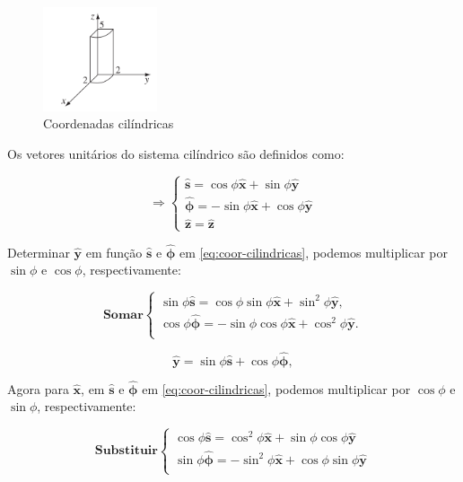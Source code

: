 \documentclass[a4paper,12pt]{article}
\begin{document}
\begin{figure}[htbp]
    \centering
    \includegraphics[width=0.3\textwidth]{images/cilindro.png}
    \caption{Coordenadas cilíndricas}
    \label{fig:exemplo}
\end{figure}


Os vetores unitários do sistema cilíndrico são definidos como:

\begin{equation}\label{eq:coor-cilindricas}
\Rightarrow
\begin{cases}
\hat{\mathbf{s}} = \cos\phi \hat{\mathbf{x}} + \sin\phi \hat{\mathbf{y}} \\
\hat{\bm{\phi}} = -\sin\phi \hat{\mathbf{x}} + \cos\phi \hat{\mathbf{y}} \\
\hat{\bm{z}} = \hat{\bm{z}}
\end{cases}
\end{equation}

Determinar $\hat{\mathbf{y}}$ em função $\hat{\mathbf{s}}$ e $\hat{\bm{\phi}}$ em \ref{eq:coor-cilindricas}, podemos multiplicar
por $\sin\phi$ e $\cos\phi$, respectivamente:

\begin{equation}
\mathbf{Somar}
\begin{cases}
    \sin\phi\hat{\mathbf{s}} = \cos\phi\sin\phi \hat{\mathbf{x}} + \sin^{2}\phi \hat{\mathbf{y}}, \\
    \cos\phi\hat{\bm{\phi}} = -\sin\phi\cos\phi \hat{\mathbf{x}} + \cos^{2}\phi \hat{\mathbf{y}}. \\
\end{cases}
\end{equation}

\begin{equation}
    \hat{\mathbf{y}} = \sin\phi \hat{\mathbf{s}} + \cos\phi \hat{\bm{\phi}},
\end{equation}

Agora para $\hat{\mathbf{x}}$, em $\hat{\mathbf{s}}$ e $\hat{\bm{\phi}}$ em \ref{eq:coor-cilindricas}, podemos multiplicar
por $\cos\phi$ e $\sin\phi$, respectivamente:

\begin{equation}
\mathbf{Substituir}
\begin{cases}
    \cos\phi\hat{\mathbf{s}} = \cos^{2}\phi \hat{\mathbf{x}} + \sin\phi\cos\phi \hat{\mathbf{y}} \\
    \sin\phi\hat{\bm{\phi}} = -\sin^{2}\phi\hat{\mathbf{x}} + \cos\phi \sin\phi \hat{\mathbf{y}} \\
\end{cases}
\end{equation}
\end{document}
